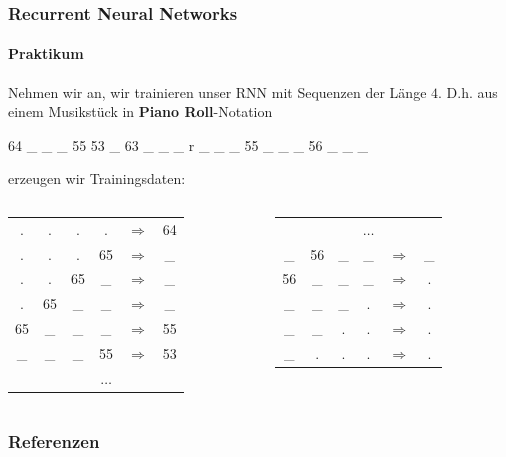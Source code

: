 \documentclass[aspectratio=169]{beamer}
\begin{document}
\begin{frame}
	\frametitle{Recurrent Neural Networks}
	\framesubtitle{Praktikum}
	Nehmen wir an, wir trainieren unser RNN mit Sequenzen der Länge $4$. D.h. aus einem Musikstück in \textbf{Piano Roll}-Notation
	\begin{center}
		64 \_ \_ \_ 55 53 \_ 63 \_ \_ \_ r \_ \_ \_ 55 \_ \_ \_ 56 \_ \_ \_ 
	\end{center}
	erzeugen wir Trainingsdaten:\\
	\begin{center}
	\begin{columns}[t]
		\begin{column}{0.4\textwidth}
			\begin{tabular}{c c c c c c}
				. & . & . & . & $\Rightarrow$ & 64 \\
				. & . & . & 65 & $\Rightarrow$ & \_ \\
				. & . & 65 & \_ & $\Rightarrow$ & \_ \\
				. & 65 & \_ & \_ & $\Rightarrow$ & \_ \\
				65 &  \_ & \_ & \_ & $\Rightarrow$ & 55 \\
				\_ & \_ & \_ & 55 & $\Rightarrow$ & 53 \\
				& & & $\ldots$ & & 
			\end{tabular}
		\end{column}
			\begin{column}{0.4\textwidth}
			\begin{tabular}{c c c c c c}
				& & & $\ldots$ & & \\
				\_ & 56 & \_ & \_ & $\Rightarrow$ & \_  \\
				56 & \_ & \_ & \_ & $\Rightarrow$ & .  \\
				\_ & \_ & \_ & . & $\Rightarrow$ & . \\
				\_ & \_ & . & . & $\Rightarrow$ & . \\ 
				\_ & . & . & . & $\Rightarrow$ & . 
			\end{tabular}
		\end{column}
	\end{columns}
\end{center}
\end{frame}

\begin{frame}[allowframebreaks]
	\frametitle{Referenzen}
	{\scriptsize%
		
		}
\end{frame}
\end{document}
